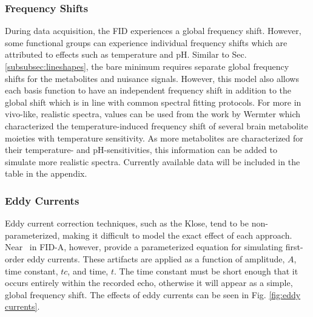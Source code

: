 
 
\subsubsection{Frequency Shifts}
During data acquisition, the FID experiences a global frequency shift. However, some functional groups 
can experience individual frequency shifts which are attributed to effects such as temperature and pH. Similar to Sec. \ref{subsubsec:lineshapes}, the bare minimum requires separate global frequency shifts for the metabolites and nuisance signals. However, this model also allows each basis function to have an independent frequency shift in addition to the global shift which is in line with common spectral fitting protocols. For more in vivo-like, realistic spectra, values can be used from the work by Wermter \etal\cite{Wermter2017} which characterized the temperature-induced frequency shift of several brain metabolite moieties with temperature sensitivity. As more metabolites are characterized for their temperature- and pH-sensitivities, this information can be added to simulate more realistic spectra. Currently available data will be included in the table in the appendix.
 
\subsubsection{Eddy Currents}
Eddy current correction techniques, such as the Klose\cite{Klose1990}, tend to be non-parameterized, making it difficult to model the exact effect of each approach. Near \etal\ in FID-A\cite{Simpson2017}, however, provide a parameterized equation for simulating first-order eddy currents. These artifacts are applied as a function of amplitude, $A$, time constant, $tc$, and time, $t$. The time constant must be short enough that it occurs entirely within the recorded echo, otherwise it will appear as a simple, global frequency shift. The effects of eddy currents can be seen in Fig. \ref{fig:eddy currents}.



